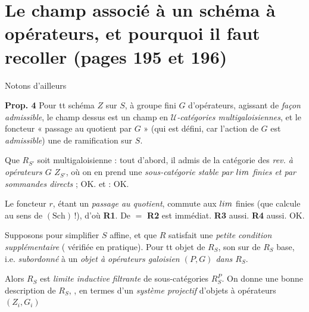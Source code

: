 \documentclass[11pt,a4paper]{article}
\begin{document}

\section*{Le champ associé à un schéma à opérateurs, et pourquoi il faut recoller (pages 195 et 196)}


Notons d'ailleurs

\textbf{Prop. 4} Pour tt schéma \struck{\ill{}} $Z$ sur $S$, à groupe fini $G$
d'opérateurs, \struck{\ill{}} agissant de \emph{façon admissible}, le champ
    dessus est un champ en
\emph{$\mathcal{U}$-catégories multigaloisiennes}, et le foncteur « passage au
quotient par $G$ » (qui est défini, car l'action de $G$ est \emph{admissible})
 \ill{} une  de ramification sur $S$.


Que $R_{S'}$ soit multigaloisienne : tout d'abord, il \ill{} admis de la
catégorie des  \emph{rev. à opérateurs $G$} 
$Z_{S'}$, où on en \ill{} prend \ill{} une \emph{sous-catégorie stable par
$\varprojlim$ finies et par sommandes directs} ; OK.  \ill{}
et \emph{\ill{}} : OK.

Le foncteur $r$, étant un \emph{passage au quotient}, commute aux
$\varinjlim$ finies (que \ill{} calcule au sens de $(\mathrm{Sch})$\,!), d'où
\textbf{R1}. De $=$ \textbf{R2} est immédiat. \textbf{R3} aussi. \textbf{R4}
aussi. OK.

 Supposons pour simplifier \ill{} $S$ \ill{} affine, et que $R$
satisfait une \emph{petite condition supplémentaire} (\ill{} vérifiée en
pratique). \struck{\ill{}} Pour tt objet de $R_S$, son \ill{} sur \ill{} de
$R_S$ \struck{\ill{}} base, i.e.  \emph{subordonné} à un
 \emph{objet à opérateurs galoisien $(P, G)$ dans $R_S$}.

Alors $R_S$ est \emph{limite inductive filtrante} de \ill{} sous-catégories
\struck{\ill{}} \ill{} $R^P_S$. On \ill{} donne une \ill{} bonne description de
$R_S$, \ill{}, en termes d'un \emph{système projectif} 
d'objets à opérateurs $(Z_i, G_i)$
\end{document}
